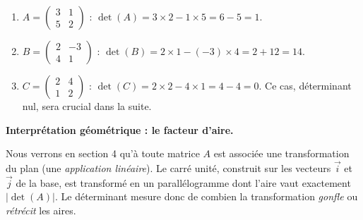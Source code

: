 \documentclass[11pt]{article}
\begin{document}
\begin{exemplebox}
\begin{enumerate}
\item $A = \begin{pmatrix} 3 & 1 \\ 5 & 2 \end{pmatrix}$ : $\det(A) = 3\times 2 - 1\times 5 = 6 - 5 = 1$.
\item $B = \begin{pmatrix} 2 & -3 \\ 4 & 1 \end{pmatrix}$ : $\det(B) = 2\times 1 - (-3)\times 4 = 2 + 12 = 14$.
\item $C = \begin{pmatrix} 2 & 4 \\ 1 & 2 \end{pmatrix}$ : $\det(C) = 2\times 2 - 4\times 1 = 4 - 4 = 0$. Ce cas, déterminant nul, sera crucial dans la suite.
\end{enumerate}
\end{exemplebox}

\textbf{Interprétation géométrique : le facteur d'aire.}\par
Nous verrons en section 4 qu'à toute matrice $A$ est associée une transformation du plan (une \emph{application linéaire}). Le carré unité, construit sur les vecteurs $\vec{i}$ et $\vec{j}$ de la base, est transformé en un parallélogramme dont l'aire vaut exactement $|\det(A)|$. Le déterminant mesure donc de combien la transformation \emph{gonfle} ou \emph{rétrécit} les aires.
\end{document}
